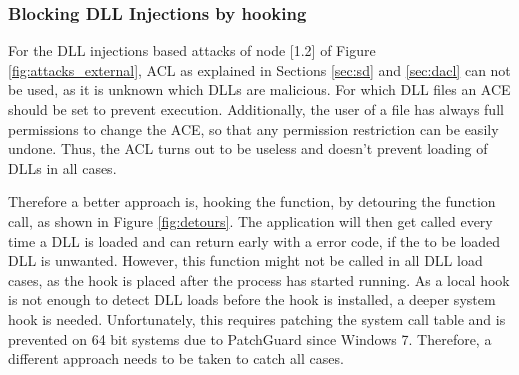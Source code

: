 \subsubsection{Blocking DLL Injections by hooking }
For the \gls{DLL} injections based attacks of node [1.2] of Figure \ref{fig:attacks_external}, \gls{ACL} as explained in Sections \ref{sec:sd} and \ref{sec:dacl} can not be used, as it is unknown which \glspl{DLL} are malicious. For which \gls{DLL} files an \gls{ACE} should be set to prevent execution. Additionally, the user of a file has always full permissions to change the \gls{ACE}, so that any permission restriction can be easily undone. Thus, the \gls{ACL} turns out to be useless and doesn't prevent loading of \glspl{DLL} in all cases. 

Therefore a better approach is, hooking the  function, by detouring the function call, as shown in Figure \ref{fig:detours}. The application will then get called every time a \gls{DLL} is loaded and can return early with a  error code, if the to be loaded \gls{DLL} is unwanted. However, this function might not be called in all \gls{DLL} load cases, as the hook is placed after the process has started running. As a local hook is not enough to detect \gls{DLL} loads before the hook is installed, a deeper system hook is needed. Unfortunately, this requires patching the system call table and is prevented on 64 bit systems due to PatchGuard since Windows 7. Therefore, a different approach needs to be taken to catch all cases.